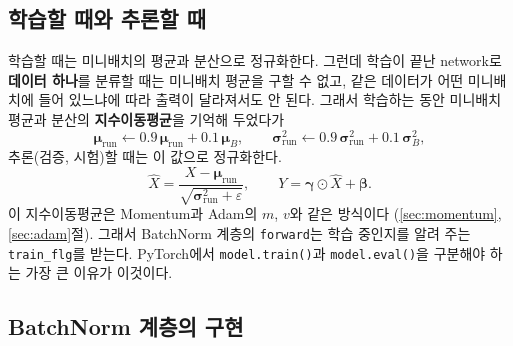 \documentclass[11pt,a4paper]{article}
\begin{document}
\subsection{학습할 때와 추론할 때}\label{sec:bntest}

학습할 때는 미니배치의 평균과 분산으로 정규화한다.
그런데 학습이 끝난 network로 \textbf{데이터 하나}를 분류할 때는 미니배치 평균을 구할 수 없고,
같은 데이터가 어떤 미니배치에 들어 있느냐에 따라 출력이 달라져서도 안 된다.
그래서 학습하는 동안 미니배치 평균과 분산의 \textbf{지수이동평균}을 기억해 두었다가
\[
\bm\mu_{\text{run}}\leftarrow0.9\,\bm\mu_{\text{run}}+0.1\,\bm\mu_B,\qquad
\bm\sigma^2_{\text{run}}\leftarrow0.9\,\bm\sigma^2_{\text{run}}+0.1\,\bm\sigma^2_B,
\]
추론(검증, 시험)할 때는 이 값으로 정규화한다.
\[
\hat X=\frac{X-\bm\mu_{\text{run}}}{\sqrt{\bm\sigma^2_{\text{run}}+\varepsilon}},\qquad Y=\bm\gamma\odot\hat X+\bm\beta.
\]
이 지수이동평균은 Momentum과 Adam의 $m$, $v$와 같은 방식이다 (\ref{sec:momentum}, \ref{sec:adam}절).
그래서 BatchNorm 계층의 \texttt{forward}는 학습 중인지를 알려 주는 \texttt{train\_flg}를 받는다.
PyTorch에서 \texttt{model.train()}과 \texttt{model.eval()}을 구분해야 하는 가장 큰 이유가 이것이다.

\subsection{BatchNorm 계층의 구현}\label{sec:bncode}
\end{document}
